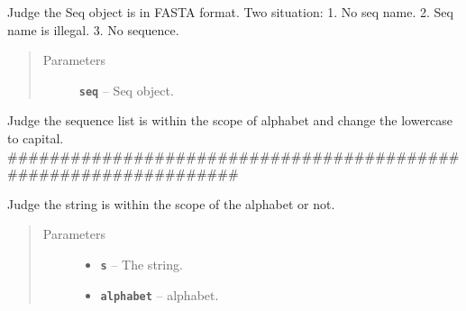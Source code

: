 \documentclass[letterpaper,10pt,english]{sphinxmanual}
\begin{document}

\begin{fulllineitems}
\label{reference/PyDNAutil:PyDNAutil.IsFasta}
Judge the Seq object is in FASTA format.
Two situation:
1. No seq name.
2. Seq name is illegal.
3. No sequence.
\begin{quote}\begin{description}
\item[{Parameters}] \leavevmode
\textbf{\texttt{seq}} -- Seq object.

\end{description}\end{quote}

\end{fulllineitems}


\begin{fulllineitems}
\label{reference/PyDNAutil:PyDNAutil.IsSequenceList}
Judge the sequence list is within the scope of alphabet and 
change the lowercase to capital.
\#\#\#\#\#\#\#\#\#\#\#\#\#\#\#\#\#\#\#\#\#\#\#\#\#\#\#\#\#\#\#\#\#\#\#\#\#\#\#\#\#\#\#\#\#\#\#\#\#\#\#\#\#\#\#\#\#\#\#\#\#\#\#\#\#

\end{fulllineitems}


\begin{fulllineitems}
\label{reference/PyDNAutil:PyDNAutil.IsUnderAlphabet}
Judge the string is within the scope of the alphabet or not.
\begin{quote}\begin{description}
\item[{Parameters}] \leavevmode\begin{itemize}
\item {} 
\textbf{\texttt{s}} -- The string.

\item {} 
\textbf{\texttt{alphabet}} -- alphabet.

\end{itemize}

\end{description}\end{quote}

\end{fulllineitems}
\end{document}
